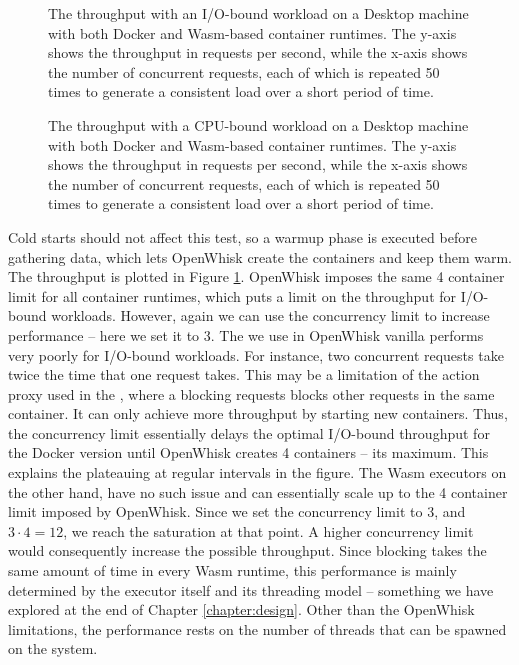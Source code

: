 \begin{figure}
    \begin{center}
        
    \end{center}
    \caption{The throughput with an I/O-bound workload on a Desktop machine with both Docker and Wasm-based container runtimes. The y-axis shows the throughput in requests per second, while the x-axis shows the number of concurrent requests, each of which is repeated 50 times to generate a consistent load over a short period of time.}
    \label{fig:pc-load-block}
\end{figure}

\begin{figure}
    \begin{center}
        
    \end{center}
    \caption{The throughput with a CPU-bound workload on a Desktop machine with both Docker and Wasm-based container runtimes. The y-axis shows the throughput in requests per second, while the x-axis shows the number of concurrent requests, each of which is repeated 50 times to generate a consistent load over a short period of time.}
    \label{fig:pc-load-hash}
\end{figure}

Cold starts should not affect this test, so a warmup phase is executed before gathering data, which lets OpenWhisk create the containers and keep them warm. The throughput is plotted in Figure \ref{fig:pc-load-block}. OpenWhisk imposes the same 4 container limit for all container runtimes, which puts a limit on the throughput for I/O-bound workloads. However, again we can use the concurrency limit to increase performance -- here we set it to 3. The  we use in OpenWhisk vanilla performs very poorly for I/O-bound workloads. For instance, two concurrent requests take twice the time that one request takes. This may be a limitation of the action proxy used in the , where a blocking requests blocks other requests in the same container. It can only achieve more throughput by starting new containers. Thus, the concurrency limit essentially delays the optimal I/O-bound throughput for the Docker version until OpenWhisk creates 4 containers -- its maximum. This explains the plateauing at regular intervals in the figure. The Wasm executors on the other hand, have no such issue and can essentially scale up to the 4 container limit imposed by OpenWhisk. Since we set the concurrency limit to 3, and $3 \cdot 4 = 12$, we reach the saturation at that point. A higher concurrency limit would consequently increase the possible throughput. Since blocking takes the same amount of time in every Wasm runtime, this performance is mainly determined by the executor itself and its threading model -- something we have explored at the end of Chapter \ref{chapter:design}. Other than the OpenWhisk limitations, the performance rests on the number of threads that can be spawned on the system.

